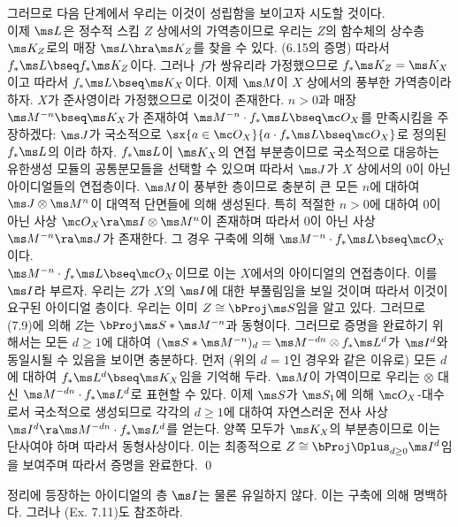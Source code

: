 \begin{theorem}
	그러므로 다음 단계에서 우리는 이것이 성립함을 보이고자 시도할 것이다.\\
	 이제 $\ms L$은 정수적 스킴 $Z$ 상에서의 가역층이므로
	우리는 $Z$의 함수체의 상수층 $\ms K_Z$로의 매장 $\ms L\hra\ms K_Z$를 찾을 수 있다. (6.15의 증명)
	따라서 $f_*\ms L\bseq f_*\ms K_Z$이다.
	그러나 $f$가 쌍유리라 가정했으므로 $f_*\ms K_Z=\ms K_X$이고 따라서 $f_*\ms L\bseq\ms K_X$이다.
	이제 $\ms M$이 $X$ 상에서의 풍부한 가역층이라 하자. $X$가 준사영이라 가정했으므로 이것이 존재한다.
	$n>0$과 매장 $\ms M^{-n}\bseq\ms K_X$가 존재하여 $\ms M^{-n}\cdot f_*\ms L\bseq\mc O_X$를 만족시킴을 주장하겠다:
	$\ms J$가 국소적으로 $\sx{a\in\mc O_X}{a\cdot f_*\ms L\bseq\mc  O_X}$로 정의된
	$f_*\ms L$의 이라 하자.
	$f_*\ms L$이 $\ms K_X$의 연접 부분층이므로 국소적으로 대응하는 유한생성 모듈의 공통분모들을 선택할 수 있으며
	따라서 $\ms J$가 $X$ 상에서의 0이 아닌 아이디얼들의 연접층이다.
	$\ms M$이 풍부한 층이므로 충분히 큰 모든 $n$에 대하여 $\ms J\otimes\ms M^n$이 대역적 단면들에 의해 생성된다.
	특히 적절한 $n>0$에 대하여 0이 아닌 사상 $\mc O_X\ra\ms I\otimes\ms M^n$이 존재하며
	따라서 0이 아닌 사상 $\ms M^{-n}\ra\ms J$가 존재한다. 그 경우 구축에 의해 $\ms M^{-n}\cdot f_*\ms L\bseq\mc O_X$이다.\\
	 $\ms M^{-n}\cdot f_*\ms L\bseq\mc O_X$이므로 이는 $X$에서의 아이디얼의 연접층이다. 이를 $\ms I$라 부르자.
	우리는 $Z$가 $X$의 $\ms I$에 대한 부풀림임을 보일 것이며 따라서 이것이 요구된 아이디얼 층이다.
	우리는 이미 $Z\cong\bProj\ms S$임을 알고 있다. 그러므로 (7.9)에 의해 $Z$는 $\bProj\ms S*\ms M^{-n}$과 동형이다.
	그러므로 증명을 완료하기 위해서는 모든 $d\ge 1$에 대하여 $(\ms S*\ms M^{-n})_d=\ms M^{-dn}\otimes f_*\ms L^d$가
	$\ms I^d$와 동일시될 수 있음을 보이면 충분하다.
	먼저 (위의 $d=1$인 경우와 같은 이유로) 모든 $d$에 대하여 $f_*\ms L^d\bseq\ms K_X$임을 기억해 두라.
	$\ms M$이 가역이므로 우리는 $\otimes$ 대신 $\ms M^{-dn}\cdot f_*\ms L^d$로 표현할 수 있다.
	이제 $\ms S$가 $\ms S_1$에 의해 $\mc O_X$-대수로서 국소적으로 생성되므로
	각각의 $d\ge 1$에 대하여 자연스러운 전사 사상 $\ms I^d\ra\ms M^{-dn}\cdot f_*\ms L^d$를 얻는다.
	양쪽 모두가 $\ms K_X$의 부분층이므로 이는 단사여야 하며 따라서 동형사상이다.
	이는 최종적으로 $Z\cong\bProj\Oplus_{d\ge 0}\ms I^d$임을 보여주며 따라서 증명을 완료한다.
	\qed
	\end{theorem}
	
	
	\begin{remark}
	정리에 등장하는 아이디얼의 층 $\ms I$는 물론 유일하지 않다. 이는 구축에 의해 명백하다. 그러나 (Ex. 7.11)도 참조하라.
	\end{remark}
	
